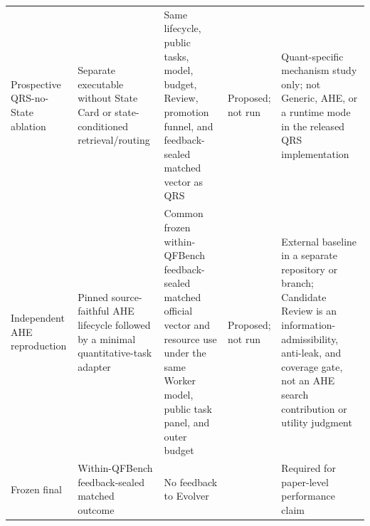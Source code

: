\begin{table}[t]
\begin{tabular}{p{}p{}p{}p{}p{}}
Prospective QRS-no-State ablation & Separate executable without State Card or
state-conditioned retrieval/routing & Same lifecycle, public tasks, model,
budget, Review, promotion funnel, and feedback-sealed matched vector as QRS &
Proposed; not run &
Quant-specific mechanism study only; not Generic, AHE, or a runtime mode in the
released QRS implementation \\

Independent AHE reproduction & Pinned source-faithful AHE lifecycle followed
by a minimal quantitative-task adapter & Common frozen within-QFBench
feedback-sealed matched official vector and resource use under the same Worker
model, public task panel, and outer
budget & Proposed; not run & External baseline in a separate repository or
branch; Candidate Review is an information-admissibility, anti-leak, and
coverage gate, not an AHE search contribution or utility judgment \\

Frozen final & Within-QFBench feedback-sealed matched outcome & No feedback to
Evolver &
\FrozenFinalStatus{} & Required for paper-level performance claim \\
\bottomrule
\end{tabular}
\end{table}

